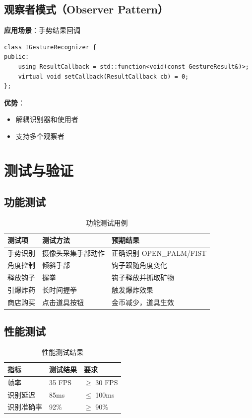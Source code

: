 \documentclass{article}
\begin{document}
\subsection{观察者模式（Observer Pattern）}

\textbf{应用场景}：手势结果回调

\begin{lstlisting}[caption=观察者模式实现]
class IGestureRecognizer {
public:
    using ResultCallback = std::function<void(const GestureResult&)>;
    virtual void setCallback(ResultCallback cb) = 0;
};
\end{lstlisting}

\textbf{优势}：
\begin{itemize}[leftmargin=*]
    \item 解耦识别器和使用者
    \item 支持多个观察者
\end{itemize}

\newpage

\section{测试与验证}

\subsection{功能测试}

\begin{table}[H]
\centering
\begin{tabular}{|l|l|l|}
\hline
\textbf{测试项} & \textbf{测试方法} & \textbf{预期结果} \\
\hline
手势识别 & 摄像头采集手部动作 & 正确识别 OPEN\_PALM/FIST \\
\hline
角度控制 & 倾斜手部 & 钩子跟随角度变化 \\
\hline
释放钩子 & 握拳 & 钩子释放并抓取矿物 \\
\hline
引爆炸药 & 长时间握拳 & 触发爆炸效果 \\
\hline
商店购买 & 点击道具按钮 & 金币减少，道具生效 \\
\hline
\end{tabular}
\caption{功能测试用例}
\end{table}

\subsection{性能测试}

\begin{table}[H]
\centering
\begin{tabular}{|l|l|l|}
\hline
\textbf{指标} & \textbf{测试结果} & \textbf{要求} \\
\hline
帧率 & 35 FPS & $\geq$ 30 FPS \\
\hline
识别延迟 & 85ms & $\leq$ 100ms \\
\hline
识别准确率 & 92\% & $\geq$ 90\% \\
\hline
\end{tabular}
\caption{性能测试结果}
\end{table}
\end{document}
